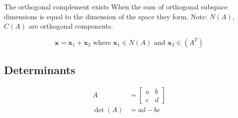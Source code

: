 \documentclass[main.tex]{subfiles}
\begin{document}
The orthogonal complement exists When the sum of orthogonal subspace dimensions is equal to the dimension of the space they form. Note: $N(A)$, $C(A)$ are orthogonal components. 

$$
\bm{x} = \bm{x}_{1} + \bm{x}_{2} \text { where } \bm{x}_{1} \in N(A) \text{ and } \bm{x}_{2} \in (A^{T})
$$

\subsection{Determinants}

$$
\begin{aligned}
A&=\left[\begin{array}{ll}
a & b \\
c & d
\end{array}\right]\\ 
\operatorname{det}(A) &= ad-bc
\end{aligned}
$$
\end{document}
